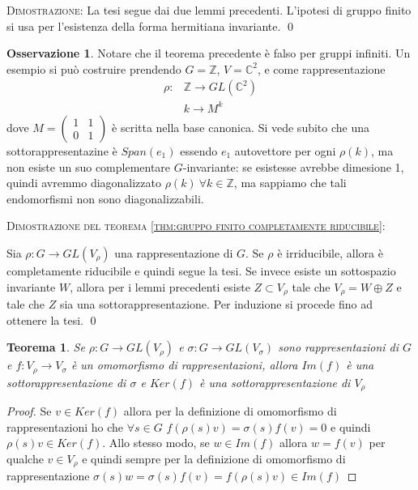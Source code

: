 \documentclass[11pt]{article}
\theoremstyle{plain}
\newtheorem{thm}{Teorema}[section]
\theoremstyle{definition}
\newtheorem*{rem}{Osservazione}
\theoremstyle{remark}
\newcommand{\C}{\mathbb{C}}
\newcommand{\Z}{\mathbb{Z}}
\begin{document}
\textsc{Dimostrazione:} La tesi segue dai due lemmi precedenti. L'ipotesi di gruppo finito si usa per l'esistenza della forma hermitiana invariante. \qed



\begin{rem} Notare che il teorema precedente è falso per gruppi infiniti. Un esempio si può costruire prendendo $G=\Z$, $V=\C^2$, e come rappresentazione
\begin{align*}
	\rho:&\Z\to GL(\C^2)\\
	&k\to M^k
\end{align*}
dove $M=\begin{pmatrix}
        	1 & 1\\
        	0 & 1
        \end{pmatrix}$ è scritta nella base canonica.\newline
Si vede subito che una sottorappresentazine è $Span(e_1)$ essendo $e_1$ autovettore per ogni $\rho(k)$, ma non esiste un suo complementare $G$-invariante: se esistesse avrebbe dimesione 1, quindi avremmo diagonalizzato $\rho(k)\ \forall k\in \Z$, ma sappiamo che tali endomorfismi non sono diagonalizzabili. 
\end{rem}


\textsc{Dimostrazione del teorema \ref{thm:gruppo finito completamente riducibile}:}

Sia $\rho: G \to GL(V_\rho)$ una rappresentazione di $G$. Se $\rho$ è irriducibile, allora è completamente riducibile e quindi segue la tesi. Se invece esiste un sottospazio invariante $W$, allora per i lemmi precedenti esiste $Z \subset V_\rho$ tale che $V_\rho = W \oplus Z$ e tale che $Z$ sia una sottorappresentazione. Per induzione si procede fino ad ottenere la tesi. \qed





\begin{thm} Se $\rho: G \to GL(V_\rho)$ e $\sigma: G \to GL(V_\sigma)$ sono rappresentazioni di $G$ e $f: V_\rho \to V_\sigma$ è un omomorfismo di rappresentazioni, allora $Im(f)$ è una sottorappresentazione di $\sigma$ e $Ker(f)$ è una sottorappresentazione di $V_\rho$
\end{thm}
\begin{proof}
Se $v\in Ker(f)$ allora per la definizione di omomorfismo di rappresentazioni ho che $\forall s\in G$ $f(\rho(s)v)=\sigma(s)f(v)=0$ e quindi $\rho(s)v\in Ker(f)$. Allo stesso modo, se $w\in Im(f)$ allora $w=f(v)$ per qualche $v\in V_\rho$ e quindi sempre per la definizione di omomorfismo di rappresentazione $\sigma(s)w=\sigma(s)f(v)=f(\rho(s)v)\in Im(f)$
\end{proof}
\end{document}
